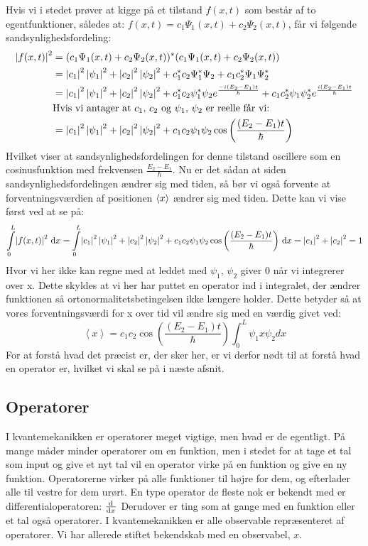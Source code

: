 \documentclass[../Kvantemekanik.tex]{subfiles}
\begin{document}
Hvis vi i stedet prøver at kigge på et tilstand $f(x,t)$ som består af to egentfunktioner, således at: $f(x,t)=c_1\Psi_1(x,t)+c_2\Psi_2(x,t)$, får vi følgende sandsynlighedsfordeling:
\begin{align*}
    \abs{f(x,t)}^2&=(c_1\Psi_1(x,t)+c_2\Psi_2(x,t))^{*}(c_1\Psi_1(x,t)+c_2\Psi_2(x,t))\\
    &=\abs{c_1}^{2}\abs{\psi_1}^{2}+\abs{c_2}^{2}\abs{\psi_2}^{2}+c_1^{*}c_2\Psi_1^{*}\Psi_2+c_1c_2^{*}\Psi_1\Psi_2^{*}\\
    &=\abs{c_1}^{2}\abs{\psi_1}^{2}+\abs{c_2}^{2}\abs{\psi_2}^{2}+c_1^{*}c_2\psi_1^{*}\psi_2e^{\frac{-i(E_2-E_1)t}{\hbar}}+c_1c_2^{*}\psi_1\psi_2^{*}e^{\frac{i(E_2-E_1)t}{\hbar}}\\
    &\text{Hvis vi antager at $c_1$, $c_2$ og $\psi_1$, $\psi_2$ er reelle får vi:}\\
    &=\abs{c_1}^{2}\abs{\psi_1}^{2}+\abs{c_2}^{2}\abs{\psi_2}^{2}+c_1c_2\psi_1\psi_2\cos\left(\frac{(E_2-E_1)t}{\hbar}\right)
\end{align*}
Hvilket viser at sandsynlighedsfordelingen for denne tilstand oscillere som en cosinusfunktion med frekvensen $\frac{E_2-E_1}{\hbar}$. Nu er det sådan at siden sandsynlighedsfordelingen ændrer sig med tiden, så bør vi også forvente at forventningsværdien af positionen $\expect x$ ændrer sig med tiden. Dette kan vi vise først ved at se på:
\begin{equation*}
    \integral{\abs{f(x,t)}^2}{x}{0}{L}=\integral{\abs{c_1}^{2}\abs{\psi_1}^{2}+\abs{c_2}^{2}\abs{\psi_2}^{2}+c_1c_2\psi_1\psi_2\cos\left(\frac{(E_2-E_1)t}{\hbar}\right)}{x}{0}{L}=\abs{c_1}^2+\abs{c_2}^2=1
\end{equation*}
Hvor vi her ikke kan regne med at leddet med $\psi_1$, $\psi_2$ giver 0 når vi integrerer over x. Dette skyldes at vi her har puttet en operator ind i integralet, der ændrer funktionen så ortonormalitetsbetingelsen ikke længere holder. Dette betyder så at vores forventningsværdi for x over tid vil ændre sig med en værdig givet ved:
\begin{equation*}
    \left<x\right>=c_1c_2\cos\left( \frac{(E_{2}-E_{1})t}{\hbar}\right)\int_{0}^{L}\psi_1x\psi_2 dx
\end{equation*}
For at forstå hvad det præcist er, der sker her, er vi derfor nødt til at forstå hvad en operator er, hvilket vi skal se på i næste afsnit.
\subsection*{Operatorer}
I kvantemekanikken er operatorer meget vigtige, men hvad er de egentligt. På mange måder minder operatorer om en funktion, men i stedet for at tage et tal som input og give et nyt tal vil en operator virke på en funktion og give en ny funktion. Operatorerne virker på alle funktioner til højre for dem, og efterlader alle til vestre for dem urørt.
En type operator de fleste nok er bekendt med er differentialoperatoren: $\dif{x}{}$ Derudover er ting som at gange med en funktion eller et tal også operatorer. I kvantemekanikken er alle observable repræsenteret af operatorer. Vi har allerede stiftet bekendskab med en observabel, $x$.
\end{document}
